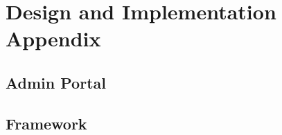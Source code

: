 \appendix
\chapter{Design and Implementation Appendix}
\section{Admin Portal}


\section{Framework}
